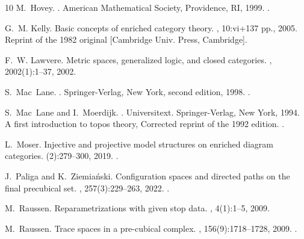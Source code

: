 \documentclass[a4paper,12pt]{amsart}
\theoremstyle{definition}
\begin{document}
\begin{thebibliography}{10}
	M.~Hovey.
	.
	\newblock American Mathematical Society, Providence, RI, 1999.
	\newblock \href {https://doi.org/10.1090/surv/063}
	{}.
	
	G.~M. Kelly.
	\newblock Basic concepts of enriched category theory.
	, 10:vi+137 pp., 2005.
	\newblock Reprint of the 1982 original [Cambridge Univ. Press, Cambridge].
	
	F.~W. Lawvere.
	\newblock Metric spaces, generalized logic, and closed categories.
	, 2002(1):1--37, 2002.
	
	S.~Mac~Lane.
	.
	\newblock Springer-Verlag, New York, second edition, 1998.
	\newblock \href {https://doi.org/10.1007/978-1-4757-4721-8}
	{}.
	
	S.~Mac~Lane and I.~Moerdijk.
	.
	\newblock Universitext. Springer-Verlag, New York, 1994.
	\newblock A first introduction to topos theory, Corrected reprint of the 1992
	edition.
	\newblock \href {https://doi.org/10.1007/978-1-4612-0927-0}
	{}.
	
	L.~Moser.
	\newblock Injective and projective model structures on enriched diagram
	categories.
	(2):279--300, 2019.
	\newblock \href {https://doi.org/10.4310/hha.2019.v21.n2.a15}
	{}.
	
	J.~Paliga and K.~Ziemia\'nski.
	\newblock Configuration spaces and directed paths on the final precubical set.
	, 257(3):229--263, 2022.
	\newblock \href {https://doi.org/10.4064/fm114-9-2021}
	{}.
	
	M.~Raussen.
	\newblock Reparametrizations with given stop data.
	, 4(1):1--5, 2009.
	
	M.~Raussen.
	\newblock Trace spaces in a pre-cubical complex.
	, 156(9):1718--1728, 2009.
	\newblock \href {https://doi.org/10.1016/j.topol.2009.02.003}
	{}.
	

\end{thebibliography}
\end{document}
